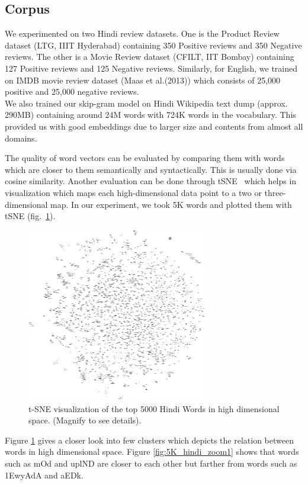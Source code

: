 \def\DevnagVersion{2.15}\documentclass[11pt]{article}
\begin{document}
\subsection{Corpus}
We experimented on two Hindi review datasets. One is the Product Review dataset (LTG, IIIT Hyderabad) containing 350 Positive reviews and 350 Negative reviews. The other is a Movie Review dataset (CFILT, IIT Bombay) containing 127 Positive reviews and 125 Negative reviews. Similarly, for English, we trained on IMDB movie review dataset (Maas et al.(2013)) which consists of 25,000 positive and 25,000 negative reviews.\\
We also trained our skip-gram model on Hindi Wikipedia text dump (approx. 290MB) containing around 24M words with 724K words in the vocabulary. This provided us with good embeddings due to larger size and contents from almost all domains.

The quality of word vectors can be evaluated by comparing them with words
which are closer to them semantically and syntactically. This is usually
done via cosine similarity.  Another evaluation can be done
through tSNE~\cite{Maaten:08} which helps in
visualization which maps each high-dimensional data point to a 
two or three-dimensional map. In our experiment, we took 5K words and plotted
them with tSNE (fig.~\ref{fig:5K_hindi_zoom}). 

\begin{figure}[ht!]
\centering
\includegraphics[width=80mm]{tsne.pdf}
\caption{t-SNE visualization of the top 5000 Hindi Words in high dimensional space.  (Magnify to see details).}
\label{fig:5K_hindi_zoom}
\end{figure}

Figure \ref{fig:5K_hindi_zoom} gives a closer look into few clusters which depicts the relation between words in high dimensional space. Figure \ref{fig:5K_hindi_zoom1} shows that words such as {\dn mOd} and {\dn uplND} are closer to each other but farther from words such as {\dn \31EwyAdA} and {\dn aEDk}.
\end{document}
